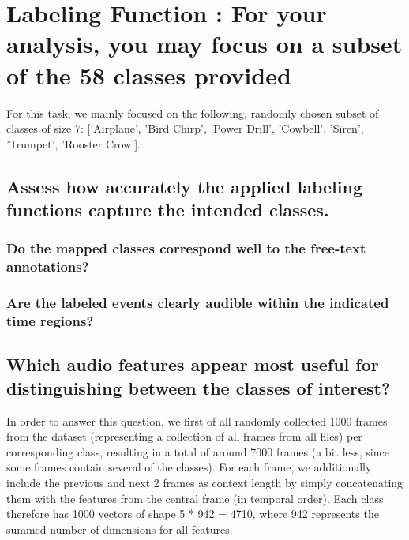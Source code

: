 
\section{Labeling Function {\normalfont\normalsize: For your analysis, you may focus on a subset of the 58 classes provided}}
\label{sec:Labeling Function}
For this task, we mainly focused on the following, randomly chosen subset of classes of size 7: ['Airplane', 'Bird Chirp', 'Power Drill', 'Cowbell', 'Siren', 'Trumpet', 'Rooster Crow'].




\subsection{Assess how accurately the applied labeling functions capture the intended classes. }
\label{sec:Labeling Function:a}



\subsubsection{Do the mapped classes correspond well to the free-text annotations? }
\label{sec:Labeling Function:a-1}



\subsubsection{Are the labeled events clearly audible within the indicated time regions? }
\label{sec:Labeling Function:a-2}






\subsection{Which audio features appear most useful for distinguishing between the classes of interest? }
\label{sec:Labeling Function:b}
In order to answer this question, we first of all randomly collected 1000 frames from the dataset (representing a collection of all frames from all files) per corresponding class, resulting in a total of around 7000 frames (a bit less, since some frames contain several of the classes). For each frame, we additionally include the previous and next 2 frames as context length by simply concatenating them with the features from the central frame (in temporal order). Each class therefore has 1000 vectors of shape 5 * 942 = 4710, where 942 represents the summed number of dimensions for all features.

